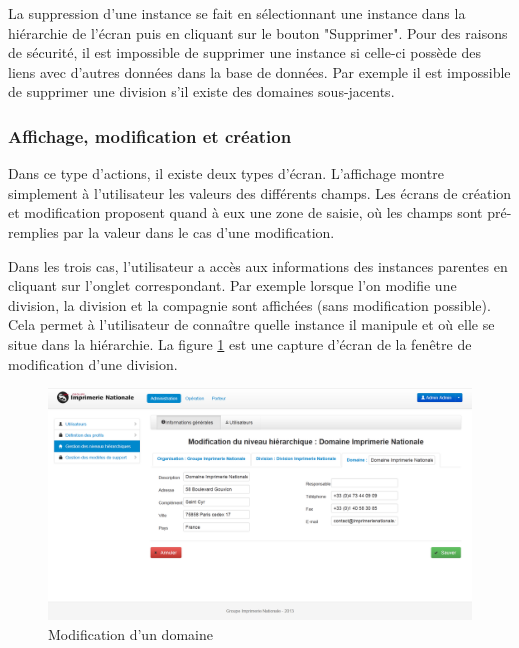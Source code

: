 La suppression d'une instance se fait en sélectionnant une instance dans la hiérarchie de l'écran puis en cliquant sur le bouton "Supprimer".
Pour des raisons de sécurité, il est impossible de supprimer une instance si celle-ci possède des liens avec d'autres données dans la base de données.
Par exemple il est impossible de supprimer une division s'il existe des domaines sous-jacents.


\subsubsection{Affichage, modification et création}

Dans ce type d'actions, il existe deux types d'écran.
L'affichage montre simplement à l'utilisateur les valeurs des différents champs.
Les écrans de création et modification proposent quand à eux une zone de saisie, où les champs sont pré-remplies par la valeur dans le cas d'une modification.

Dans les trois cas, l'utilisateur a accès aux informations des instances parentes en cliquant sur l'onglet correspondant.
Par exemple lorsque l'on modifie une division, la division et la compagnie sont affichées (sans modification possible).
Cela permet à l'utilisateur de connaître quelle instance il manipule et où elle se situe dans la hiérarchie.
La figure \ref{instances_modification} est une capture d'écran de la fenêtre de modification d'une division.
\begin{figure}[!h]
	\center
	\includegraphics[width=1\textwidth]{img/instances_modification.png}
	\caption{Modification d'un domaine}
	\label{instances_modification}
\end{figure}


